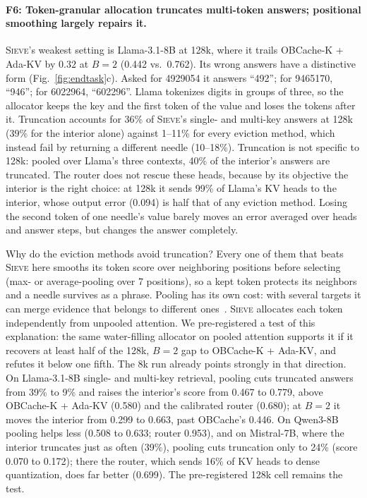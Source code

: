 \documentclass{article}
\newif\ifshowtbd \showtbdtrue
\newcommand{\tbd}[1]{\ifshowtbd{\color{tbdcol}\textbf{TBD}~#1}\else\ifhmode\unskip\fi\fi}
\newif\ifshowest \showesttrue
\DeclareRobustCommand{\est}[1]{\ifshowest{\color{estcol}#1}\else---\fi}
\DeclareRobustCommand{\estonly}[1]{\ifshowest#1\else\ifhmode\unskip\fi\fi}
\newcommand{\sieve}{\textsc{Sieve}}
\theoremstyle{definition}
\begin{document}
\paragraph{F6: Token-granular allocation truncates multi-token answers; positional smoothing largely repairs it.}
\sieve{}'s weakest setting is Llama-3.1-8B at 128k, where it trails OBCache-K + Ada-KV by $0.32$ at $B=2$ (0.442 vs.\ 0.762).  Its wrong answers have a distinctive form (Fig.~\ref{fig:endtask}c).  Asked for 4929054 it answers ``492''; for 9465170, ``946''; for 6022964, ``602296''.  Llama tokenizes digits in groups of three, so the allocator keeps the key and the first token of the value and loses the tokens after it.  Truncation accounts for 36\% of \sieve{}'s single- and multi-key answers at 128k (39\% for the interior alone) against 1--11\% for every eviction method, which instead fail by returning a different needle (10--18\%).  Truncation is not specific to 128k: pooled over Llama's three contexts, 40\% of the interior's answers are truncated.  The router does not rescue these heads, because by its objective the interior is the right choice: at 128k it sends 99\% of Llama's KV heads to the interior, whose output error (0.094) is half that of any eviction method.  Losing the second token of one needle's value barely moves an error averaged over heads and answer steps, but changes the answer completely.

Why do the eviction methods avoid truncation?  Every one of them that beats \sieve{} here smooths its token score over neighboring positions before selecting (max- or average-pooling over 7 positions), so a kept token protects its neighbors and a needle survives as a phrase.  Pooling has its own cost: with several targets it can merge evidence that belongs to different ones~\citep{zhang2026fixedcontract}.  \sieve{} allocates each token independently from unpooled attention.  We pre-registered a test of this explanation: the same water-filling allocator on pooled attention supports it if it recovers at least half of the 128k, $B=2$ gap to OBCache-K + Ada-KV, and refutes it below one fifth.  The 8k run already points strongly in that direction.  On Llama-3.1-8B single- and multi-key retrieval, pooling cuts truncated answers from 39\% to 9\% and raises the interior's score from 0.467 to 0.779, above OBCache-K + Ada-KV (0.580) and the calibrated router (0.680); at $B=2$ it moves the interior from 0.299 to 0.663, past OBCache's 0.446.  On Qwen3-8B pooling helps less (0.508 to 0.633; router 0.953), and on Mistral-7B, where the interior truncates just as often (39\%), pooling cuts truncation only to 24\% (score 0.070 to 0.172); there the router, which sends 16\% of KV heads to dense quantization, does far better (0.699).  The pre-registered 128k cell remains the test. 
\end{document}
